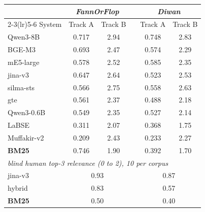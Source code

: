 \begin{tabular}{l cc c cc}
\toprule
& \multicolumn{2}{c}{\textit{FannOrFlop}} & & \multicolumn{2}{c}{\textit{Diwan}} \\
\cmidrule(lr){2-3}\cmidrule(lr){5-6}
System & Track A & Track B & & Track A & Track B \\
\midrule
Qwen3-8B & 0.717 & 2.94 & & 0.748 & 2.83 \\
BGE-M3 & 0.693 & 2.47 & & 0.574 & 2.29 \\
mE5-large & 0.578 & 2.52 & & 0.585 & 2.35 \\
jina-v3 & 0.647 & 2.64 & & 0.523 & 2.53 \\
silma-sts & 0.566 & 2.75 & & 0.558 & 2.63 \\
gte & 0.561 & 2.37 & & 0.488 & 2.18 \\
Qwen3-0.6B & 0.549 & 2.35 & & 0.527 & 2.14 \\
LaBSE & 0.311 & 2.07 & & 0.368 & 1.75 \\
Muffakir-v2 & 0.209 & 2.43 & & 0.233 & 2.27 \\
\midrule
\textbf{BM25} & 0.746 & 1.90 & & 0.392 & 1.70 \\
\midrule
\multicolumn{6}{l}{\textit{blind human top-3 relevance (0 to 2), 10 per corpus}} \\
jina-v3 & \multicolumn{2}{c}{0.93} & & \multicolumn{2}{c}{0.87} \\
hybrid & \multicolumn{2}{c}{0.83} & & \multicolumn{2}{c}{0.57} \\
\textbf{BM25} & \multicolumn{2}{c}{0.50} & & \multicolumn{2}{c}{0.40} \\
\bottomrule
\end{tabular}